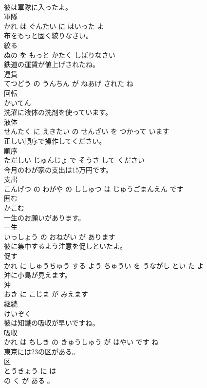 \documentclass[8pt]{extreport}
\begin{document}
\begin{CJK}{UTF8}{min}
\\	彼は軍隊に入ったよ。	
\\	軍隊 
\\	かれ は ぐんたい に はいった よ			
\\	布をもっと固く絞りなさい。	
\\	絞る 
\\	ぬの を もっと かたく しぼりなさい			
\\	鉄道の運賃が値上げされたね。	
\\	運賃 
\\	てつどう の うんちん が ねあげ された ね			
\\	回転	
\\	かいてん			
\\	洗濯に液体の洗剤を使っています。	
\\	液体 
\\	せんたく に えきたい の せんざい を つかって います			
\\	正しい順序で操作してください。	
\\	順序 
\\	ただしい じゅんじょ で そうさ して ください			
\\	今月のわが家の支出は15万円です。	
\\	支出 
\\	こんげつ の わがや の ししゅつ は じゅうごまんえん です			
\\	囲む	
\\	かこむ			
\\	一生のお願いがあります。	
\\	一生 
\\	いっしょう の おねがい が あります			
\\	彼に集中するよう注意を促しといたよ。	
\\	促す 
\\	かれ に しゅうちゅう する よう ちゅうい を うながし とい た よ			
\\	沖に小島が見えます。	
\\	沖 
\\	おき に こじま が みえます			
\\	継続	
\\	けいぞく			
\\	彼は知識の吸収が早いですね。	
\\	吸収 
\\	かれ は ちしき の きゅうしゅう が はやい です ね			
\\	東京には23の区がある。	
\\	区 
\\	とうきょう に は 
\\	の く が ある 。			

\end{CJK}
\end{document}
